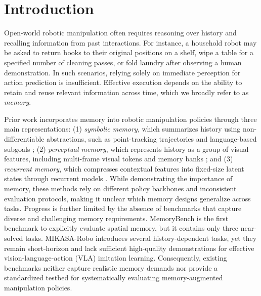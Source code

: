 
\section{Introduction}

Open-world robotic manipulation often requires reasoning over history and recalling information from past interactions. 
For instance, a household robot may be asked to return books to their original positions on a shelf, wipe a table for a specified number of cleaning passes, or fold laundry after observing a human demonstration.
In such scenarios, relying solely on immediate perception for action prediction is insufficient. Effective execution depends on the ability to retain and reuse relevant information across time, which we broadly refer to as \textit{memory}.




Prior work incorporates memory into robotic manipulation policies through three main representations:
(1) \textit{symbolic memory}, which summarizes history using non-differentiable abstractions, such as point-tracking trajectories \cite{chen2025history} and language-based subgoals \cite{sridhar2025memer};
(2) \textit{perceptual memory}, which represents history as a group of visual features, including  multi-frame visual tokens \cite{jang2025contextvla} and memory banks \cite{fang2025sam2act, shi2025memoryvla}; 
and (3) \textit{recurrent memory}, which compresses contextual features into fixed-size latent states through recurrent models \cite{zhou2025mtil, liu2024robomamba}.
While demonstrating the importance of memory, these methods rely on different policy backbones and inconsistent evaluation protocols, making it unclear which memory designs generalize across tasks.
Progress is further limited by the absence of benchmarks that capture diverse and challenging memory requirements. 
MemoryBench \cite{fang2025sam2act} is the first benchmark to explicitly evaluate spatial memory, but it contains only three near-solved tasks. MIKASA-Robo \cite{cherepanov2025memory} introduces several history-dependent tasks, yet they remain short-horizon and lack sufficient high-quality demonstrations for effective vision-language-action (VLA) imitation learning. Consequently, existing benchmarks neither capture realistic memory demands nor provide a standardized testbed for systematically evaluating memory-augmented manipulation policies.

